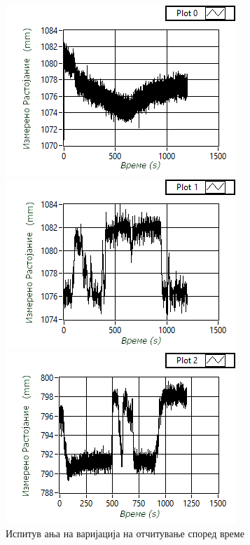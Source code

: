 \documentclass[11pt]{article}
\begin{document}
    \begin{figure}[H]
      \centering
      \begin{minipage}{0.45\linewidth}
        \centering
        \includegraphics[width = \textwidth]{./images/kinect_graph_1_mk.png}
      \end{minipage}
      \begin{minipage}{0.45\linewidth}
          \centering
          \includegraphics[width = \textwidth]{./images/kinect_graph_2_mk.png}
        \end{minipage}
      \includegraphics[width = 0.45\linewidth]{./images/kinect_graph_3_mk.png}
      \caption{Испитув ања на варијација на отчитување според време}
      \label{fig:kinectgraphs}
      \end{figure}
\end{document}
